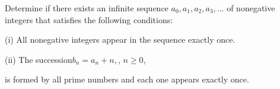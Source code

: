 Determine if there exists an infinite sequence $a_0, a_1, a_2, a_3,...$ of nonegative integers that satisfies the following conditions:

(i)	All nonegative integers appear in the sequence exactly once.

(ii)	The succession$b_n=a_{n}+n,$,  $n\geq0$, 

is formed by all prime numbers and each one appears exactly once.